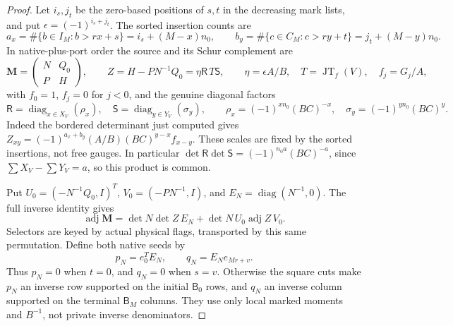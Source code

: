 \documentclass[11pt,a4paper]{amsart}
\numberwithin{equation}{section}
\theoremstyle{plain}
\theoremstyle{definition}
\newcommand{\JT}{\operatorname{JT}}
\begin{document}
\begin{proof}
Let \(i_s,j_t\) be the zero-based positions of \(s,t\) in the
decreasing mark lists, and put \(\epsilon=(-1)^{i_s+j_t}\).
The sorted insertion counts are
\[
 a_x=\#\{b\in I_M:b>rx+s\}=i_s+(M-x)n_0,\qquad
 b_y=\#\{c\in C_M:c>ry+t\}=j_t+(M-y)n_0.
\]
In native-plus-port order the source and its Schur complement are
\[
 \mathbf M=\begin{pmatrix}N&Q_0\\ P&H\end{pmatrix},\qquad
 Z=H-PN^{-1}Q_0=\eta\mathsf R\,T\mathsf S,\qquad
 \eta=\epsilon A/B,\quad T=\JT_f(V),\quad f_j=G_j/A,
\]
with \(f_0=1\), \(f_j=0\) for \(j<0\), and the genuine diagonal factors
\[
 \mathsf R=\operatorname{diag}_{x\in X_V}(\rho_x),\quad
 \mathsf S=\operatorname{diag}_{y\in Y_V}(\sigma_y),\qquad
 \rho_x=(-1)^{xn_0}(BC)^{-x},\quad
 \sigma_y=(-1)^{yn_0}(BC)^y.
\]
Indeed the bordered determinant just computed gives
\(Z_{xy}=(-1)^{a_x+b_y}(A/B)(BC)^{y-x}f_{x-y}\).
These scales are fixed by the sorted insertions, not free gauges.
In particular
\(\det\mathsf R\det\mathsf S=(-1)^{n_0a}(BC)^{-a}\),
since \(\sum X_V-\sum Y_V=a\), so this product is common.

Put \(U_0=(-N^{-1}Q_0,I)^T\), \(V_0=(-PN^{-1},I)\), and
\(E_N=\operatorname{diag}(N^{-1},0)\).  The full inverse identity gives
\begin{equation}\label{rt:full-adjugate}
 \operatorname{adj}\mathbf M
 =\det N\det Z\,E_N+\det N\,U_0\operatorname{adj}Z\,V_0.
\end{equation}
Selectors are keyed by actual physical flags, transported by
this same permutation.  Define both native seeds by
\[
 p_N=e_0^TE_N,\qquad q_N=E_Ne_{Mr+v}.
\]
Thus \(p_N=0\) when \(t=0\), and \(q_N=0\) when \(s=v\).
Otherwise the square cuts make \(p_N\) an inverse row supported on
the initial \(\mathsf B_0\) rows, and \(q_N\) an inverse column
supported on the terminal \(\mathsf B_M\) columns.  They use only
local marked moments and \(B^{-1}\), not private inverse denominators.


\end{proof}
\end{document}
